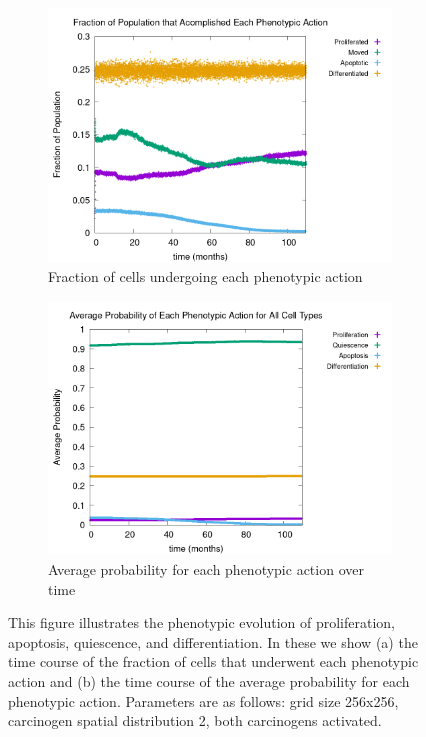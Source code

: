 \documentclass[\main/thesis.tex]{subfiles}
\begin{document}
\begin{figure}[H]
    \centering
    \begin{subfigure}[t]{.65\textwidth}
      \centering
      \includegraphics[width=\textwidth]{images/2_GeneralObservations/Fig3/numPheno_all.png}
      \caption{Fraction of cells undergoing each phenotypic action}
      \label{fig:GeneralObservations_numPheno}
    \end{subfigure}
    \begin{subfigure}[t]{.65\textwidth}
      \centering
      \includegraphics[width=\textwidth]{images/2_GeneralObservations/Fig3/chancePheno_all.png}
      \caption{Average probability for each phenotypic action over time}
      \label{fig:GeneralObservations_chancePheno}
    \end{subfigure}
    \caption{This figure illustrates the phenotypic evolution of proliferation, apoptosis, quiescence, and differentiation. In these we show (a) the time course of the fraction of cells that underwent each phenotypic action and (b) the time course of the average probability for each phenotypic action. Parameters are as follows: grid size 256x256, carcinogen spatial distribution 2, both carcinogens activated.}
    \label{fig:GeneralObservations_PhenoEvo}
\end{figure}
 
\end{document}
